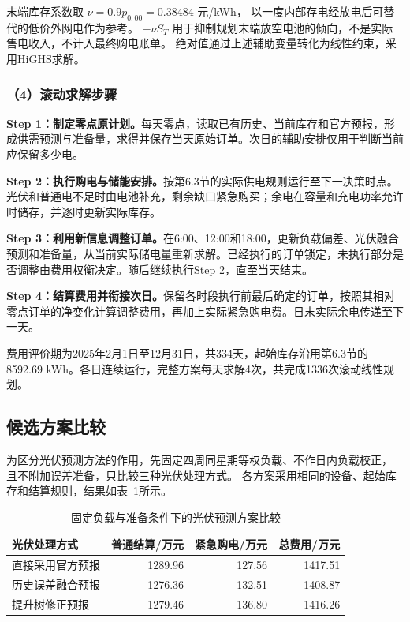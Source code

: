 末端库存系数取 $\nu=0.9p_{0:00}=0.38484$ 元/kWh，
以一度内部存电经放电后可替代的低价外网电作为参考。
$-\nu S_T$ 用于抑制规划末端放空电池的倾向，不是实际售电收入，不计入最终购电账单。
绝对值通过上述辅助变量转化为线性约束，采用HiGHS求解。

\subsubsection*{（4）滚动求解步骤}

\textbf{Step 1：制定零点原计划。}每天零点，读取已有历史、当前库存和官方预报，形成供需预测与准备量，求得并保存当天原始订单。次日的辅助安排仅用于判断当前应保留多少电。

\textbf{Step 2：执行购电与储能安排。}按第6.3节的实际供电规则运行至下一决策时点。光伏和普通电不足时由电池补充，剩余缺口紧急购买；余电在容量和充电功率允许时储存，并逐时更新实际库存。

\textbf{Step 3：利用新信息调整订单。}在6:00、12:00和18:00，更新负载偏差、光伏融合预测和准备量，从当前实际储电量重新求解。已经执行的订单锁定，未执行部分是否调整由费用权衡决定。随后继续执行Step 2，直至当天结束。

\textbf{Step 4：结算费用并衔接次日。}保留各时段执行前最后确定的订单，按照其相对零点订单的净变化计算调整费用，再加上实际紧急购电费。日末实际余电传递至下一天。

费用评价期为2025年2月1日至12月31日，共334天，起始库存沿用第6.3节的8592.69 kWh。各日连续运行，完整方案每天求解4次，共完成1336次滚动线性规划。

\subsection{候选方案比较}

为区分光伏预测方法的作用，先固定四周同星期等权负载、不作日内负载校正，
且不附加误差准备，只比较三种光伏处理方式。
各方案采用相同的设备、起始库存和结算规则，结果如表~\ref{tab:q3_candidate}所示。

\begin{table}[H]
\centering
\caption{固定负载与准备条件下的光伏预测方案比较}
\label{tab:q3_candidate}
\begin{tabular}{lrrr}
\toprule
光伏处理方式 & 普通结算/万元 & 紧急购电/万元 & 总费用/万元\\
\midrule
直接采用官方预报 &1289.96&127.56&1417.51\\
历史误差融合预报 &1276.36&132.51&1408.87\\
提升树修正预报 &1279.46&136.80&1416.26\\
\bottomrule
\end{tabular}
\end{table}

